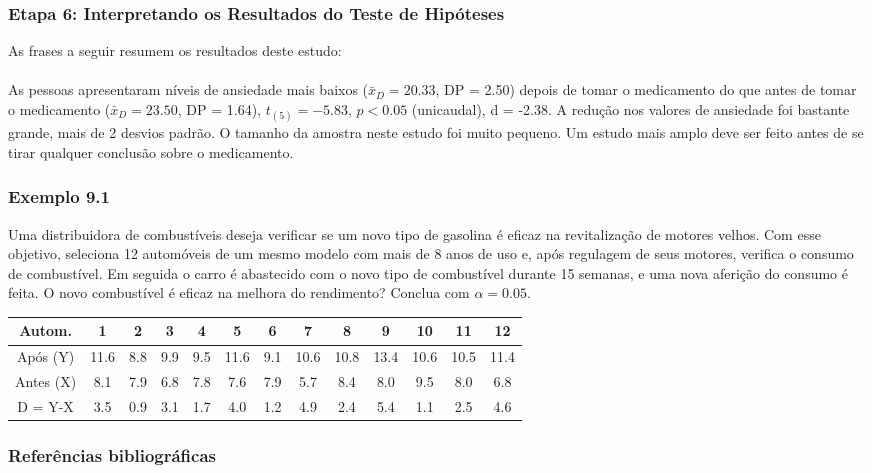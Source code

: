 \documentclass[11pt]{beamer}
\begin{document}
\begin{frame}
\frametitle{Etapa 6: Interpretando os Resultados do Teste de Hipóteses}

As frases a seguir resumem os resultados deste estudo:\\~\\

As pessoas apresentaram níveis de ansiedade mais baixos (\(\bar{x}_D = 20.33\), DP = 2.50) depois de tomar o medicamento do que antes de tomar o medicamento (\(\bar{x}_D = 23.50\), DP = 1.64), \(t_{(5)} = -5.83\), \(p < 0.05\) (unicaudal), d = -2.38. A redução nos valores de ansiedade foi bastante grande, mais de 2 desvios padrão. O tamanho da amostra neste estudo foi muito pequeno. Um estudo mais amplo deve ser feito antes de se tirar qualquer conclusão sobre o medicamento.

\end{frame}


\begin{frame}
\frametitle{Exemplo 9.1}
Uma distribuidora de combustíveis deseja verificar se um novo tipo de gasolina é eficaz na revitalização de motores velhos. Com esse objetivo, seleciona 12 automóveis de um mesmo modelo com mais de 8 anos de uso e, após regulagem de seus motores, verifica o consumo de combustível. Em seguida o carro é abastecido com o novo tipo de combustível durante 15 semanas, e uma nova aferição do consumo é feita. O novo combustível é eficaz na melhora do rendimento? Conclua com \(\alpha=0.05\).

\begin{table}[h]
\tiny
\centering
\begin{tabular}{|c|c|c|c|c|c|c|c|c|c|c|c|c|}
\hline
Autom. & 1 & 2 & 3 & 4 & 5 & 6 & 7 & 8 & 9 & 10 & 11 & 12 \\
\hline
Após (Y) & 11.6 & 8.8 & 9.9 & 9.5 & 11.6 & 9.1 & 10.6 & 10.8 & 13.4 & 10.6 & 10.5 & 11.4 \\
\hline
Antes (X) & 8.1 & 7.9 & 6.8 & 7.8 & 7.6 & 7.9 & 5.7 & 8.4 & 8.0 & 9.5 & 8.0 & 6.8 \\
\hline
D = Y-X & 3.5 & 0.9 & 3.1 & 1.7 & 4.0 & 1.2 & 4.9 & 2.4 & 5.4 & 1.1 & 2.5 & 4.6 \\
\hline
\end{tabular}
\end{table}

\end{frame}

\begin{frame}
\frametitle{Referências bibliográficas}
\printbibliography
\end{frame}
\end{document}
